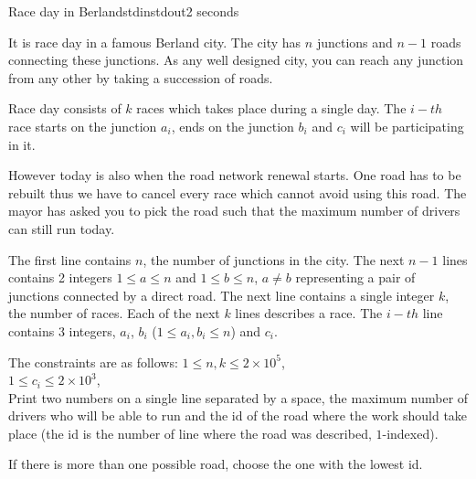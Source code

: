 \begin{problem}{Race day in Berland}{stdin}{stdout}{2 seconds}



It is race day in a famous Berland city. 
The city has $n$ junctions and $n-1$ roads connecting these junctions. 
As any well designed city, you can reach any junction from any other by taking a succession of roads. 

Race day consists of $k$ races which takes place during a single day. The $i-th$ race starts on the junction $a_i$, ends on the junction $b_i$ and $c_i$ will be participating in it.


However today is also when the road network renewal starts. One road has to be rebuilt thus we have to cancel every race which cannot avoid using this road. 
The mayor has asked you to pick the road such that the maximum number of drivers can still run today.

\InputFile

The first line contains $n$, the number of junctions in the city.
The next $n-1$ lines contains 2 integers $1\le a \le n$ and $1 \le b \le n$, $a\not = b$ representing a pair of junctions connected by a direct road. 
The next line contains a single integer $k$, the number of races.
Each of the next $k$ lines describes a race.
The $i-th$ line contains 3 integers, $a_i$, $b_i$ ($1\le a_i,b_i\le n$) and $c_i$.

The constraints are as follows:
$1\le n,k \le 2\times 10^5$,\\ 
$1\le c_i \le 2\times 10^3$,\\ 


\OutputFile
Print two numbers on a single line separated by a space, the maximum number of drivers who will be able to run and the id of the road where the work should take place (the id is the number of line where the road was described, $1$-indexed).

If there is more than one possible road, choose the one with the lowest id.

\Example

\begin{examplewide}
\exmp{
}{
}%
\end{examplewide}

\end{problem}
